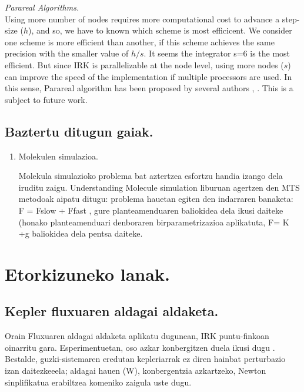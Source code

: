 \vspace{5mm}
\textit{Parareal Algorithms.}\\

Using more number of nodes requires more computational cost to advance a step-size ($h$), and so, we have to known which scheme is most efficicent. We consider one scheme is more efficient than another, if this scheme achieves the same precision with the smaller value of $h/s$. It seems the integrator s=6 is the most efficient. 
But since IRK is parallelizable at the node level, using more nodes ($s$) can improve the speed of the implementation if multiple processors are used. In this sense, Parareal algorithm has been proposed by several authors \cite{Gander2014}, \cite{Jimenez-Perez2011}. This is a subject to future work.

\subsection*{Baztertu ditugun gaiak.}

\begin{enumerate}
\item Molekulen simulazioa.

Molekula simulazioko problema bat aztertzea esfortzu handia izango dela iruditu zaigu. Understanding
Molecule simulation liburuan agertzen den MTS metodoak aipatu ditugu: problema hauetan egiten den
indarraren banaketa: F = Fslow + Ffast , gure planteamenduaren baliokidea dela ikusi daiteke (honako
planteamenduari denboraren birparametrizazioa aplikatuta, F= K +g baliokidea dela pentsa daiteke.

\end{enumerate}

\section{Etorkizuneko lanak.}

\subsection*{Kepler fluxuaren aldagai aldaketa.}

Orain Fluxuaren aldagai aldaketa aplikatu dugunean, IRK puntu-finkoan oinarritu gara. Esperimentuetan, oso azkar konbergitzen duela ikusi dugu . Bestalde, guzki-sistemaren eredutan kepleriarrak ez diren hainbat perturbazio izan daitezkeeela; aldagai hauen (W), konbergentzia
azkartzeko, Newton sinplifikatua erabiltzea komeniko zaigula uste dugu.

